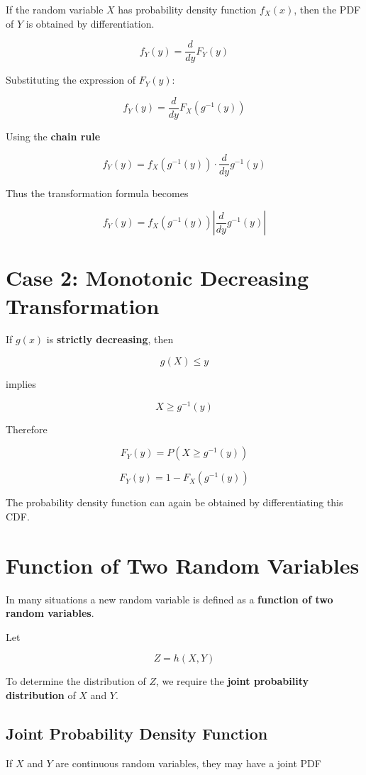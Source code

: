 \documentclass[12pt]{article}
\begin{document}
If the random variable $X$ has probability density function $f_X(x)$, then the PDF of $Y$ is obtained by differentiation.

\[
f_Y(y) = \frac{d}{dy}F_Y(y)
\]

Substituting the expression of $F_Y(y)$:

\[
f_Y(y) = \frac{d}{dy}F_X(g^{-1}(y))
\]

Using the \textbf{chain rule}

\[
f_Y(y) =
f_X(g^{-1}(y))
\cdot
\frac{d}{dy}g^{-1}(y)
\]

Thus the transformation formula becomes

\[
f_Y(y) =
f_X(g^{-1}(y))
\left|
\frac{d}{dy}g^{-1}(y)
\right|
\]

\section{Case 2: Monotonic Decreasing Transformation}

If $g(x)$ is \textbf{strictly decreasing}, then

\[
g(X) \le y
\]

implies

\[
X \ge g^{-1}(y)
\]

Therefore

\[
F_Y(y) = P(X \ge g^{-1}(y))
\]

\[
F_Y(y) = 1 - F_X(g^{-1}(y))
\]

The probability density function can again be obtained by differentiating this CDF.

\section{Function of Two Random Variables}

In many situations a new random variable is defined as a \textbf{function of two random variables}.

Let

\[
Z = h(X,Y)
\]

To determine the distribution of $Z$, we require the \textbf{joint probability distribution} of $X$ and $Y$.

\subsection*{Joint Probability Density Function}

If $X$ and $Y$ are continuous random variables, they may have a joint PDF
\end{document}
